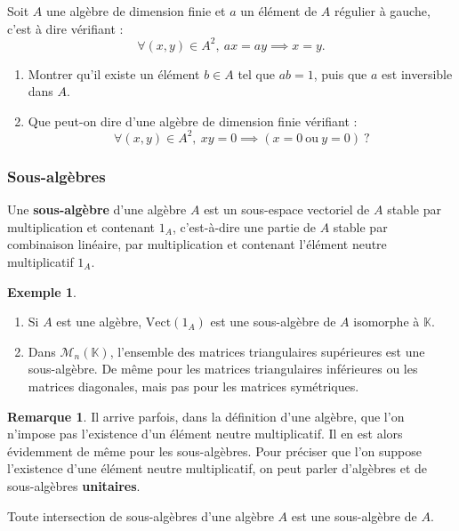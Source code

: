 \documentclass[french]{article}
\newcommand{\K}{\mathbb{K}}
\newcommand{\Vect}{\text{Vect}}
\theoremstyle{plain}
\theoremstyle{definition}
\newtheorem*{ex}{Exemple}
\newtheorem*{rmq}{Remarque}
\theoremstyle{remark}
\begin{document}
\begin{exo}
	Soit $A$ une algèbre de dimension finie et $a$ un élément de $A$ régulier à gauche, c'est à dire vérifiant : $$\forall (x,y)\in A^2,\ ax=ay\implies x=y.$$
	\begin{enumerate}
		\item Montrer qu'il existe un élément $b\in A$ tel que $ab=1$, puis que $a$ est inversible dans $A$.
		\item Que peut-on dire d'une algèbre de dimension finie vérifiant : $$\forall (x,y)\in A^2,\ xy=0\implies (x=0\ \text{ou}\ y=0)\ ?$$
	\end{enumerate}
\end{exo}

\subsubsection*{Sous-algèbres}

\begin{dfn}
	Une \textbf{sous-algèbre} d'une algèbre $A$ est un sous-espace vectoriel de $A$ stable par multiplication et contenant $1_A$, c'est-à-dire une partie de $A$ stable par combinaison linéaire, par multiplication et contenant l'élément neutre multiplicatif $1_A$.
\end{dfn}

\begin{ex}
	\begin{enumerate}
		\item Si $A$ est une algèbre, $\Vect(1_A)$ est une sous-algèbre de $A$ isomorphe à $\K$.
		\item Dans $\mathcal{M}_n(\K)$, l'ensemble des matrices triangulaires supérieures est une sous-algèbre. De même pour les matrices triangulaires inférieures ou les matrices diagonales, mais pas pour les matrices symétriques.
	\end{enumerate}
\end{ex}

\begin{rmq}
	Il arrive parfois, dans la définition d'une algèbre, que l'on n'impose pas l'existence d'un élément neutre multiplicatif. Il en est alors évidemment de même pour les sous-algèbres. Pour préciser que l'on suppose l'existence d'une élément neutre multiplicatif, on peut parler d'algèbres et de sous-algèbres \textbf{unitaires}.
\end{rmq}

\begin{prop}%
	Toute intersection de sous-algèbres d'une algèbre $A$ est une sous-algèbre de $A$.
\end{prop}
\end{document}
